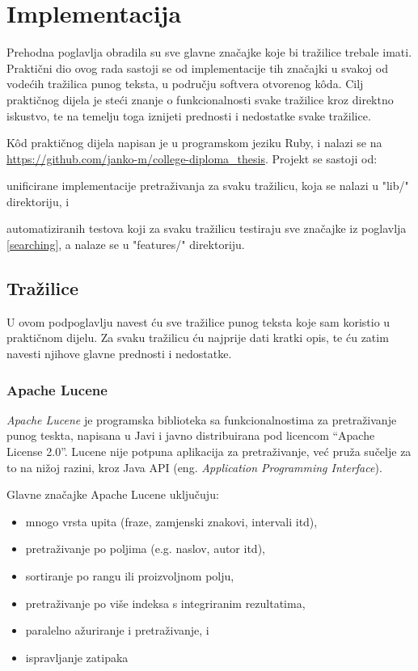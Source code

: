 \documentclass[a4paper,twoside,12pt]{scrreprt}
\begin{document}
\chapter{Implementacija}

Prehodna poglavlja obradila su sve glavne značajke koje bi tražilice trebale imati. Praktični dio ovog rada sastoji se od implementacije tih značajki u svakoj od vodećih tražilica punog teksta, u području softvera otvorenog kôda. Cilj praktičnog dijela je steći znanje o funkcionalnosti svake tražilice kroz direktno iskustvo, te na temelju toga iznijeti prednosti i nedostatke svake tražilice.

Kôd praktičnog dijela napisan je u programskom jeziku Ruby, i nalazi se na \url{https://github.com/janko-m/college-diploma_thesis}. Projekt se sastoji od:

\begin{compactenum}
  \item unificirane implementacije pretraživanja za svaku tražilicu, koja se nalazi u "lib/" direktoriju, i
  \item automatiziranih testova koji za svaku tražilicu testiraju sve značajke iz poglavlja \ref{searching}, a nalaze se u "features/" direktoriju.
\end{compactenum}

\section{Tražilice}

U ovom podpoglavlju navest ću sve tražilice punog teksta koje sam koristio u praktičnom dijelu. Za svaku tražilicu ću najprije dati kratki opis, te ću zatim navesti njihove glavne prednosti i nedostatke.

\subsection{Apache Lucene}

\textit{Apache Lucene} je programska biblioteka sa funkcionalnostima za pretraživanje punog teskta, napisana u Javi i javno distribuirana pod licencom ``Apache License 2.0''. Lucene nije potpuna aplikacija za pretraživanje, već pruža sučelje za to na nižoj razini, kroz Java API (eng. \textit{Application Programming Interface}).

Glavne značajke Apache Lucene uključuju:

\begin{itemize}
  \item mnogo vrsta upita (fraze, zamjenski znakovi, intervali itd),
  \item pretraživanje po poljima (e.g. naslov, autor itd),
  \item sortiranje po rangu ili proizvoljnom polju,
  \item pretraživanje po više indeksa s integriranim rezultatima,
  \item paralelno ažuriranje i pretraživanje, i
  \item ispravljanje zatipaka
\end{itemize}
\end{document}

